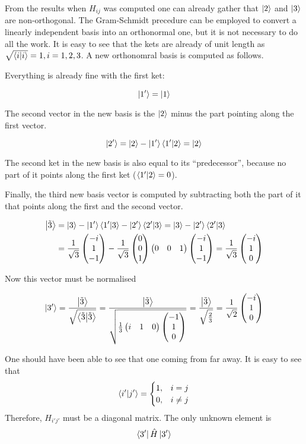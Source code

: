 \documentclass{article}
\newcommand*\colvec[3][]{
    \begin{pmatrix}\ifx\relax#1\relax\else#1\\\fi#2\\#3\end{pmatrix}
}
\begin{document}
From the results when $H_{ij}$ was computed one can already gather that $\ket{2}$ and $\ket{3}$ are non-orthogonal. The Gram-Schmidt precedure can be employed to convert a linearly independent basis into an orthonormal one, but it is not necessary to do all the work. It is easy to see that the kets are already of unit length as $\sqrt{\braket{i}{i}} = 1, i=1,2,3$. A new orthonomral basis is computed as follows.

Everything is already fine with the first ket:

\begin{equation}
\ket{1'}=\ket{1}
\end{equation}

The second vector in the new basis is the $\ket{2}$ minus the part pointing along the first vector. 

\begin{equation}
\ket{2'}=\ket{2}-\ket{1'}\braket{1'}{2}=\ket{2}
\end{equation}

The second ket in the new basis is also equal to its ``predecessor'', because no part of it points along the first ket ($\braket{1'}{2}=0$).

Finally, the third new basis vector is computed by subtracting both the part of it that points along the first and the second vector.

\begin{align}
\ket{\tilde{3}}&=\ket{3}-\ket{1'}\braket{1'}{3}-\ket{2'}\braket{2'}{3}
=\ket{3}-\ket{2'}\braket{2'}{3}\\
&=\frac{1}{\sqrt{3}}\colvec[-i]{1}{-1} - 
\frac{1}{\sqrt{3}}\colvec[0]{0}{1}\begin{pmatrix}0 & 0 & 1\end{pmatrix}\colvec[-i]{1}{-1}=\frac{1}{\sqrt{3}}\colvec[-i]{1}{0}
\end{align}

Now this vector must be normalised

\begin{equation}
\ket{3'}=\frac{\ket{\tilde{3}}}{\sqrt{\braket{\tilde{3}}}}
=\frac{\ket{\tilde{3}}}{\sqrt{\frac{1}{3}\begin{pmatrix}i & 1 & 0\end{pmatrix}\colvec[-1]{1}{0}}}=
\frac{\ket{\tilde{3}}}{\sqrt{\frac{2}{3}}}=\frac{1}{\sqrt{2}}\colvec[-i]{1}{0}
\end{equation}

One should have been able to see that one coming from far away. It is easy to see that 
\begin{equation}
\braket{i'}{j'}=
\begin{cases}
1, & i=j\\
0, & i\neq j
\end{cases}
\end{equation}
Therefore, $H_{i'j'}$ must be a diagonal matrix. The only unknown element is
\begin{equation}
\bra{3'}\hat{H}\ket{3'}
\end{equation}
\end{document}
